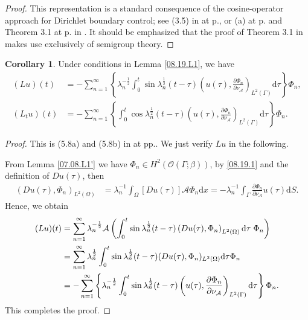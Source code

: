 \documentclass[preprint,12pt]{elsarticle}
\theoremstyle{definition}   %
\newtheorem{corollary}[theorem]{Corollary}
\numberwithin{equation}{section}
\def\pt{\partial}
\def\pt{\partial}
\def\Om{\Omega}
\def\la{\lambda}
\def\be{\beta}
\def\Ga{\Gamma}
\def\iy{\infty}
\def\f{\frac}
\def\df{\mathrm d}
\def\mcO{\mathcal{O}}
\def\mcA{\mathcal{A}}
\begin{document}
\begin{proof}
	This representation is a standard consequence of the cosine-operator approach for Dirichlet boundary control; see (3.5) in \cite{Lasiecka1} at p., or (a) at p. and Theorem 3.1 at p. in \cite{Lasiecka2}. It should be emphasized that the proof of Theorem 3.1 in \cite{Lasiecka2} makes use exclusively of semigroup theory. 
\end{proof}



\begin{corollary}\label{08.19.C2}
	Under conditions in Lemma \ref{08.19.L1}, we have 
	\begin{equation*}
		\begin{split}
			(Lu)(t)
			&=-\sum_{n=1}^\iy \left\{\la_n^{-\f{1}{2}}\int_0^t \sin \la_n^\f{1}{2}(t-\tau) \left(u(\tau), \f{\pt\Phi_n}{\pt\nu_\mcA}\right)_{L^2(\Ga)}\df\tau\right\} \Phi_n,\\
			(L_tu)(t)
			&=-\sum_{n=1}^\iy \left\{\int_0^t\cos \la_n^\f{1}{2}(t-\tau)\left(u(\tau), \f{\pt\Phi_n}{\pt \nu_\mcA}\right)_{L^2(\Ga)} \df\tau\right\}\Phi_n. 
		\end{split}
	\end{equation*}
\end{corollary}

\begin{proof}
	This is (5.8a) and (5.8b) in \cite{Lasiecka2} at pp.. We just verify $Lu$ in the following. 
	
	From Lemma \ref{07.08.L1'} we have $\Phi_n\in H^2(\mcO(\Ga; \be))$, by \eqref{08.19.1} and the definition of $Du(\tau)$,   then
	\begin{equation*}
		\begin{split}
			(Du(\tau), \Phi_n)_{L^2(\Om)}
			&=\la_n^{-1}\int_\Om [Du(\tau)]\mcA\Phi_n\df x=-\la_n^{-1}\int_\Ga \f{\pt \Phi_n}{\pt\nu_\mcA} u(\tau)\df S.
		\end{split}
	\end{equation*}
	Hence, we obtain 
	\begin{equation}\label{08.20.1}
		\begin{split} 
		(Lu)(t)
		&=\sum_{n=1}^\iy\la_n^{-\f{1}{2}} \mcA\left(\int_0^t \sin\la_n^\f{1}{2}(t-\tau)\left(Du(\tau),\Phi_n\right)_{L^2(\Om)}\df \tau\hspace{1mm}\Phi_n\right)\\
		&=\sum_{n=1}^\iy \la_n^\f{1}{2}\int_0^t\sin \la_n^\f{1}{2}(t-\tau)(Du(\tau), \Phi_n)_{L^2(\Om)}\df\tau\Phi_n\\
		&=-\sum_{n=1}^\iy \left\{\la_n^{-\f{1}{2}}\int_0^t \sin \la_n^\f{1}{2}(t-\tau) \left(u(\tau), \f{\pt\Phi_n}{\pt\nu_\mcA}\right)_{L^2(\Ga)}\df\tau\right\} \Phi_n.
		\end{split} 
	\end{equation}
	This completes the proof. 
\end{proof}
\end{document}
